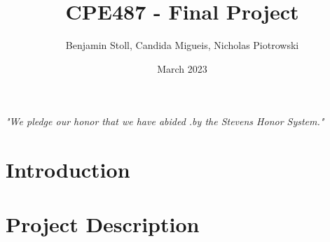 \documentclass{article}
\title{CPE487 - Final Project}
\author{Benjamin Stoll, Candida Migueis, Nicholas Piotrowski}
\date{March 2023}
\begin{document}
\maketitle

\emph{"We pledge our honor that we have abided .by the Stevens Honor System."}


\section*{Introduction}


\section*{Project Description}

\end{document}
